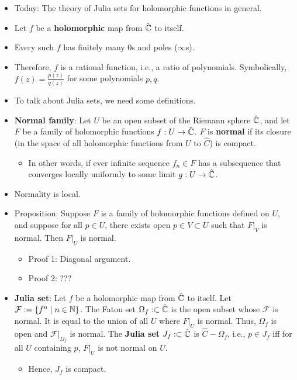 \documentclass[../main.tex]{subfiles}
\begin{document}
\begin{itemize}
\begin{itemize}
    \end{itemize}
    \item Today: The theory of Julia sets for holomorphic functions in general.
    \item Let $f$ be a \textbf{holomorphic} map from $\hat{\mathbb{C}}$ to itself.
    \item Every such $f$ has finitely many 0s and poles ($\infty$s).
    \item Therefore, $f$ is a rational function, i.e., a ratio of polynomials. Symbolically, $f(z)=\frac{p(z)}{q(z)}$ for some polynomials $p,q$.
    \item To talk about Julia sets, we need some definitions.
    \item \textbf{Normal family}: Let $U$ be an open subset of the Riemann sphere $\hat{\mathbb{C}}$, and let $F$ be a family of holomorphic functions $f:U\to\hat{\mathbb{C}}$. $F$ is \textbf{normal} if its closure (in the space of all holomorphic functions from $U$ to $\hat{C}$) is compact.
    \begin{itemize}
        \item In other words, if ever infinite sequence $f_n\in F$ has a subsequence that converges locally uniformly to some limit $g:U\to\hat{\mathbb{C}}$.
    \end{itemize}
    \item Normality is local.
    \item Proposition: Suppose $F$ is a family of holomorphic functions defined on $U$, and suppose for all $p\in U$, there exists open $p\in V\subset U$ such that $F|_V$ is normal. Then $F|_U$ is normal.
    \begin{itemize}
        \item Proof 1: Diagonal argument.
        \item Proof 2: ???
    \end{itemize}
    \item \textbf{Julia set}: Let $f$ be a holomorphic map from $\hat{\mathbb{C}}$ to itself. Let $\mathcal{F}:=\{f^n\mid n\in\mathbb{N}\}$. The Fatou set $\Omega_f:\subset\hat{\mathbb{C}}$ is the open subset whose $\mathcal{F}$ is normal. It is equal to the union of all $U$ where $F|_U$ is normal. Thus, $\Omega_f$ is open and $\mathcal{F}|_{\Omega_f}$ is normal. The \textbf{Julia set} $J_f:\subset\hat{\mathbb{C}}$ is $\hat{C}-\Omega_f$, i.e., $p\in J_f$ iff for all $U$ containing $p$, $F|_U$ is not normal on $U$.
    \begin{itemize}
        \item Hence, $J_f$ is compact.
    \end{itemize}

\end{itemize}
\end{document}
